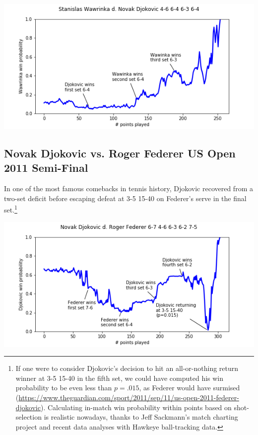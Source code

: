 \documentclass[chapterprefix=false]{report}
\begin{document}
\includegraphics[scale=.7]{wawrinka_djokovic_fo_15}

\subsection{Novak Djokovic vs. Roger Federer US Open 2011 Semi-Final}

In one of the most famous comebacks in tennis history, Djokovic recovered from a two-set deficit before escaping defeat at 3-5 15-40 on Federer's serve in the final set.\footnote{If one were to consider Djokovic's decision to hit an all-or-nothing return winner at 3-5 15-40 in the fifth set, we could have computed his win probability to be even less than $p=.015$, as Federer would have surmised (\url{https://www.theguardian.com/sport/2011/sep/11/us-open-2011-federer-djokovic}). Calculating in-match win probability within points based on shot-selection is realistic nowadays, thanks to Jeff Sackmann's match charting project and recent data analyses with Hawkeye ball-tracking data.}

\includegraphics[scale=.7]{djokovic_federer_uso_11}





\end{document}
